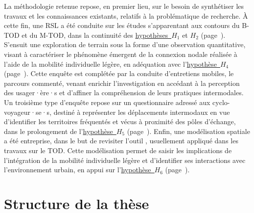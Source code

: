\begin{refsegment}
La méthodologie retenue repose, en premier lieu, sur le besoin de synthétiser les travaux et les connaissances existants, relatifs à la problématique de recherche. À cette fin, une \acrfull{RSL} a été conduite sur les études s’apparentant aux contours du \acrshort{B-TOD} et du \acrshort{M-TOD}, dans la continuité des \hyperref[hypothese-1]{hypothèses~\(H_1\)} et \hyperref[hypothese-2]{\(H_2\)} (page~\pageref{hypothese-2}). S'ensuit une exploration de terrain sous la forme d’une observation quantitative, visant à caractériser le phénomène émergent de la connexion nodale réalisée à l'aide de la mobilité individuelle légère, en adéquation avec l'\hyperref[hypothese-4]{hypothèse~\(H_4\)} (page~\pageref{hypothese-4}). Cette enquête est complétée par la conduite d'entretiens mobiles, le parcours commenté, venant enrichir l'investigation en accédant à la \gls{perception} des usager·ère·s et d'affiner la compréhension de leurs pratiques intermodales. Un troisième type d’enquête repose sur un questionnaire adressé aux cyclo-voyageur·se·s, destiné à représenter les déplacements intermodaux en vue d’identifier les territoires fréquentés et vécus à proximité des pôles d’échange, dans le prolongement de l'\hyperref[hypothese-5]{hypothèse~\(H_5\)} (page~\pageref{hypothese-5}). Enfin, une modélisation spatiale a été entreprise, dans le but de revisiter l'outil , usuellement appliqué dans les travaux sur le \acrshort{TOD}. Cette modélisation permet de saisir les implications de l’intégration de la mobilité individuelle légère et d’identifier ses interactions avec l’environnement urbain, en appui sur l'\hyperref[hypothese-6]{hypothèse~\(H_6\)} (page~\pageref{hypothese-6}).%

\section*{Structure de la thèse
    \label{introduction-generale:annonce-plan}
    }


\end{refsegment}
